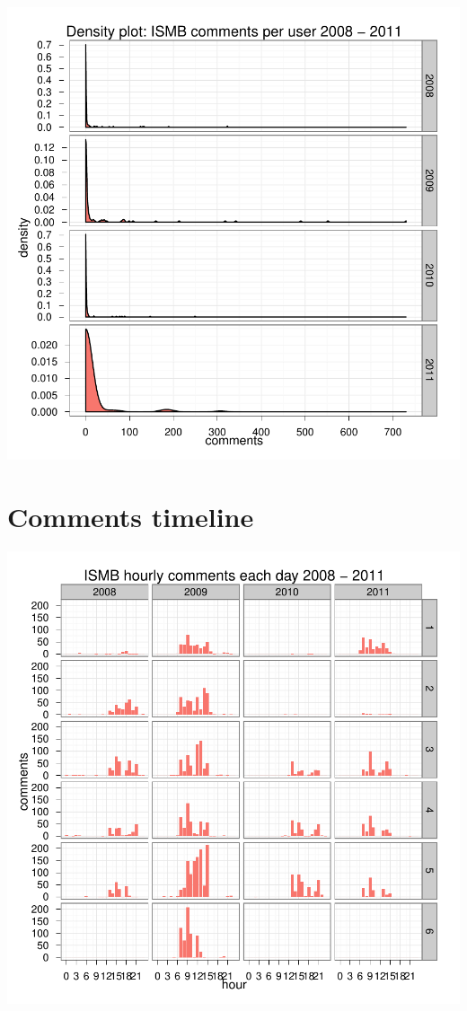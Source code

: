 \documentclass[a4paper,10pt]{article}
\begin{document}
\begin{center}
\includegraphics{ismb-013}
\end{center}

\section{Comments timeline}

\begin{center}
\includegraphics{ismb-015}
\end{center}
\end{document}
